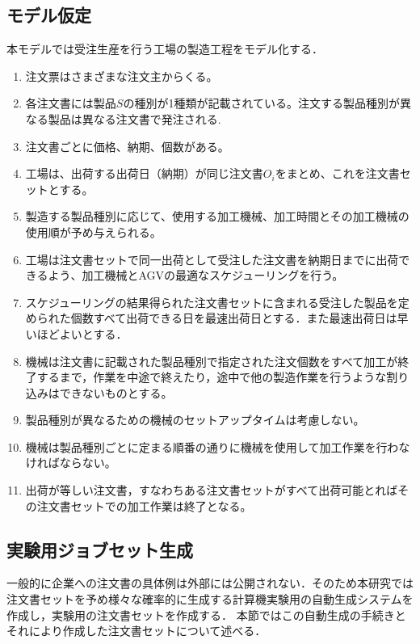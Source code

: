 \documentclass[twocolumn]{jarticle}
\begin{document}
\subsection{モデル仮定}
本モデルでは受注生産を行う工場の製造工程をモデル化する．
\begin{enumerate}
    \item 注文票はさまざまな注文主からくる。
    \item 各注文書には製品$S$の種別が1種類が記載されている。注文する製品種別が異なる製品は異なる注文書で発注される.
    \item 注文書ごとに価格、納期、個数がある。
    \item 工場は、出荷する出荷日（納期）が同じ注文書$O_{\textit{i}}$をまとめ、これを注文書セットとする。
    \item 製造する製品種別に応じて、使用する加工機械、加工時間とその加工機械の使用順が予め与えられる。
    \item 工場は注文書セットで同一出荷として受注した注文書を納期日までに出荷できるよう、加工機械とAGVの最適なスケジューリングを行う。
    \item スケジューリングの結果得られた注文書セットに含まれる受注した製品を定められた個数すべて出荷できる日を最速出荷日とする．また最速出荷日は早いほどよいとする．
    \item 機械は注文書に記載された製品種別で指定された注文個数をすべて加工が終了するまで，作業を中途で終えたり，途中で他の製造作業を行うような割り込みはできないものとする。
    \item 製品種別が異なるための機械のセットアップタイムは考慮しない。
    \item 機械は製品種別ごとに定まる順番の通りに機械を使用して加工作業を行わなければならない。
    \item 出荷が等しい注文書，すなわちある注文書セットがすべて出荷可能とればその注文書セットでの加工作業は終了となる。
    \end{enumerate}

\subsection{実験用ジョブセット生成}
一般的に企業への注文書の具体例は外部には公開されない．そのため本研究では注文書セットを予め様々な確率的に生成する計算機実験用の自動生成システムを作成し，実験用の注文書セットを作成する．
本節ではこの自動生成の手続きとそれにより作成した注文書セットについて述べる．
\end{document}
